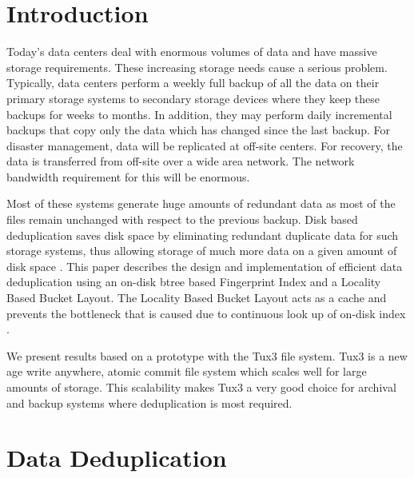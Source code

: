 \documentclass[final]{ols}
\begin{document}
\begin{abstract}

\end{abstract}

\section{Introduction}
Today's data centers deal with enormous volumes of data and have massive storage requirements.
These increasing storage needs cause a serious problem. Typically, data centers perform a weekly
full backup of all the data on their primary storage systems to secondary storage devices where 
they keep these backups for weeks to months. In addition, they may perform daily incremental backups 
that copy only the data which has changed since the last backup. For disaster management, 
data will be replicated at off-site centers. For recovery, the data is transferred from off-site over 
a wide area network. The network bandwidth requirement for this will be enormous. 

Most of these systems generate huge amounts of redundant data as most of the files remain unchanged 
with respect to the previous backup. Disk based deduplication saves disk space by eliminating redundant 
duplicate data for such storage systems, thus allowing storage of much more data on a given amount 
of disk space \cite{1,2}. 
This paper describes the design and implementation of efficient data deduplication 
using an on-disk btree based Fingerprint Index and a Locality Based Bucket Layout. The Locality Based Bucket Layout acts as 
a cache and prevents the bottleneck that is caused due to continuous look up of on-disk index \cite{3}.

We present results based on a prototype with the Tux3 file system. 
Tux3 is a new age write anywhere, atomic commit file system which scales well for large amounts of storage. 
This scalability makes Tux3 a very good choice for archival and backup systems where deduplication is most required.

\section{Data Deduplication}
\end{document}
